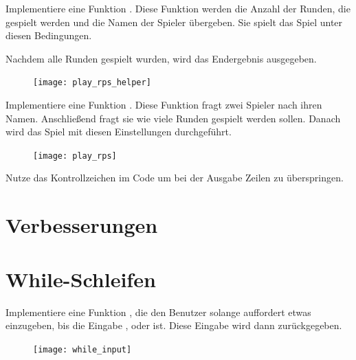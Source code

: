 \documentclass[a4paper, DIV = calc]{scrartcl}
\begin{document}
\begin{aufgabe} \noindent 
Implementiere eine Funktion . Diese Funktion werden die Anzahl der Runden, die gespielt werden und die Namen der Spieler übergeben. Sie spielt das Spiel unter diesen Bedingungen.


Nachdem alle Runden gespielt wurden, wird das Endergebnis ausgegeben.\\ 
\begin{figure}[H]
	\centering	
	\texttt{[image: play\_rps\_helper]}

\end{figure}
\end{aufgabe}


\begin{aufgabe} \noindent 
Implementiere eine Funktion . Diese Funktion fragt zwei Spieler nach ihren Namen. Anschließend fragt sie wie viele Runden gespielt werden sollen. Danach wird das Spiel mit diesen Einstellungen durchgeführt.\\ 
\begin{figure}[H]
	\centering	
	\texttt{[image: play\_rps]}

\end{figure}
\end{aufgabe}


\begin{aufgabe}
Nutze das Kontrollzeichen  im Code um bei der Ausgabe Zeilen zu überspringen. 
\end{aufgabe}
\pagebreak
\section{Verbesserungen}

\section{While-Schleifen}
\begin{aufgabe} \noindent
Implementiere eine Funktion , die den Benutzer solange auffordert etwas einzugeben, bis die Eingabe  ,   oder   ist. Diese Eingabe wird dann zurückgegeben.
\begin{figure}[H]
	\centering	
	\texttt{[image: while\_input]}

\end{figure}

\end{aufgabe}
\end{document}
